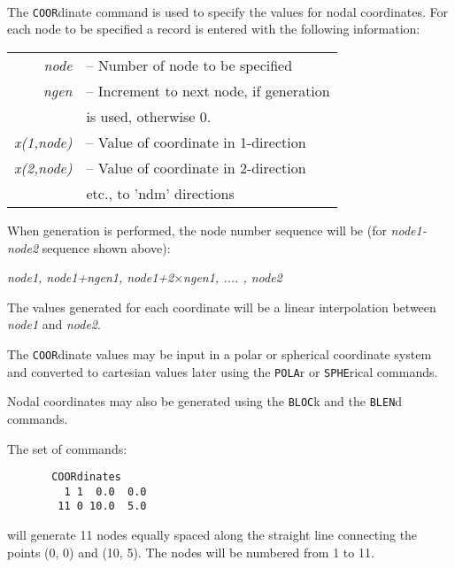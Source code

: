 \\{\smallskip}
 \\{\smallskip}
 \\{\smallskip}
\headb

The {\tt COOR}dinate command is used to specify the values for
nodal coordinates.  For each node to be specified a record
is entered with the following information:

\begin{center}
\begin{tabular}{r l}
\it node     &-- Number of node to be specified \\
\it ngen     &-- Increment to next node, if generation \\
             &\quad is used, otherwise 0. \\
\it x(1,node)&-- Value of coordinate in 1-direction \\
\it x(2,node)&-- Value of coordinate in 2-direction \\
             &\quad etc., to 'ndm' directions \\
\end{tabular}
\end{center}
When generation is performed, the node number sequence
will be (for {\it node1-node2} sequence shown above):

\begin{center}
{\it node1, node1+ngen1, node1+2$\times$ngen1, .... , node2}
\end{center}

The values generated for each coordinate will be a linear interpolation
between {\it node1} and {\it node2}.

The {\tt COOR}dinate values may be input in a polar or spherical
coordinate system and converted to cartesian values later
using the {\tt POLA}r or {\tt SPHE}rical commands.

Nodal coordinates may also be generated using the {\tt BLOC}k and the
{\tt BLEN}d commands.


The set of commands:
\begin{verbatim}
       COORdinates
         1 1  0.0  0.0
        11 0 10.0  5.0

\end{verbatim}
will generate 11 nodes equally spaced along the straight line connecting the
points (0, 0) and (10, 5).  The nodes will be numbered from 1 to 11.
\vfil\eject

